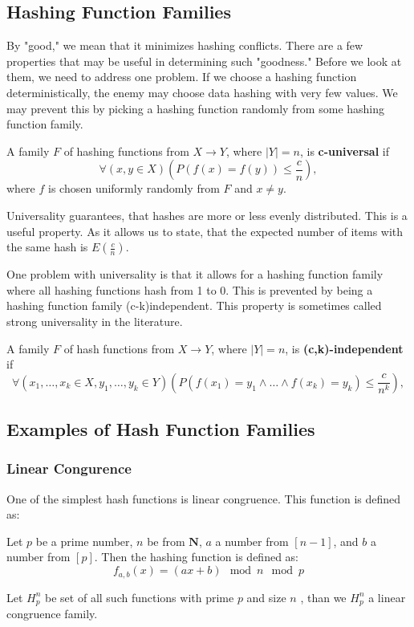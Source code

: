 \subsection{Hashing Function Families}
By "good," we mean that it minimizes hashing conflicts. There are a few properties that may be useful in determining such "goodness." Before we look at them, we need to address one problem. If we choose a hashing function deterministically, the enemy may choose data hashing with very few values. We may prevent this by picking a hashing function randomly from some hashing function family.

\begin{defn}
A family \( F \) of hashing functions from \( X \rightarrow Y \), where \( |Y| = n \), is \textbf{c-universal} if 
\[ \forall (x, y \in X) \left( P\left(f(x) = f(y)\right) \leq \frac{c}{n} \right), \]
where \( f \) is chosen uniformly randomly from \( F \) and \(x \neq y \).
\end{defn}

Universality guarantees, that hashes are more or less evenly distributed. This is a useful property. As it allows us to state, that the expected number of items with the same hash is $E(\frac{c}{n})$. 

One problem with universality is that it allows for a hashing function family where all hashing functions hash from 1 to 0. This is prevented by being a hashing function family (c-k)independent. This property is sometimes called strong universality in the literature.

\begin{defn}
A family \( F \) of hash functions from \( X \rightarrow Y \), where \( |Y| = n \), is \textbf{(c,k)-independent} if 
\[ \forall (x_1, \dots, x_k \in X, y_1, \dots, y_k \in Y) \left( P\left(f(x_1) = y_1 \land \dots \land f(x_k) = y_k\right) \leq \frac{c}{n^k} \right), \]
\end{defn}

\subsection{Examples of Hash Function Families}

\subsubsection{Linear Congurence}
One of the simplest hash functions is linear congruence. This function is defined as:
\begin{defn}
    Let \( p \) be a prime number, \(n\)  be from $\mathbf{N}$,  \( a \) a number from \([n-1]\), and \( b \) a number from \([p]\). Then the hashing function is defined as:
    \[ f_{a,b}(x) = (ax + b) \mod n \mod p\]

    Let $H_p^n$ be set of all such functions with prime $p$ and size $n$ , than we $H_p^n$ a linear congruence family.
\end{defn}
 
